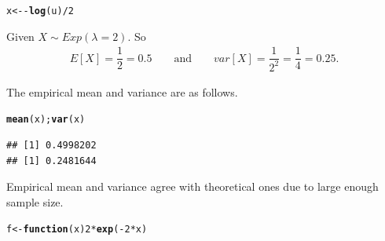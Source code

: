 \documentclass[11pt, a4paper]{article}\usepackage[]{graphicx}\usepackage[]{xcolor}
\makeatletter
\newcommand{\hlnum}[1]{\textcolor[rgb]{0.686,0.059,0.569}{#1}}%
\newcommand{\hlopt}[1]{\textcolor[rgb]{0,0,0}{#1}}%
\newcommand{\hldef}[1]{\textcolor[rgb]{0.345,0.345,0.345}{#1}}%
\newcommand{\hlkwa}[1]{\textcolor[rgb]{0.161,0.373,0.58}{\textbf{#1}}}%
\newcommand{\hlkwb}[1]{\textcolor[rgb]{0.69,0.353,0.396}{#1}}%
\newcommand{\hlkwc}[1]{\textcolor[rgb]{0.333,0.667,0.333}{#1}}%
\newcommand{\hlkwd}[1]{\textcolor[rgb]{0.737,0.353,0.396}{\textbf{#1}}}%
\newenvironment{kframe}{%
 \def\at@end@of@kframe{}%
 \ifinner\ifhmode%
  \def\at@end@of@kframe{\end{minipage}}%
  \begin{minipage}{\columnwidth}%
 \fi\fi%
 \def\FrameCommand##1{\hskip\@totalleftmargin \hskip-\fboxsep
 \colorbox{shadecolor}{##1}\hskip-\fboxsep
     \hskip-\linewidth \hskip-\@totalleftmargin \hskip\columnwidth}%
 \MakeFramed {\advance\hsize-\width
   \@totalleftmargin\z@ \linewidth\hsize
   \@setminipage}}%
 {\par\unskip\endMakeFramed%
 \at@end@of@kframe}
\newenvironment{knitrout}{}{} %
\makeatother
\begin{document}
\begin{knitrout}
\color{fgcolor}\begin{kframe}
\begin{alltt}
\hldef{x} \hlkwb{<-} \hlopt{-} \hlkwd{log}\hldef{(u)} \hlopt{/} \hlnum{2}
\end{alltt}
\end{kframe}
\end{knitrout}

Given $X \sim Exp(\lambda = 2)$. So
\begin{align*}
E[X] = \dfrac{1}{2} = 0.5 \qquad \text{and} \qquad var[X] = \dfrac{1}{2^2} = \dfrac{1}{4} = 0.25.
\end{align*}

The empirical mean and variance are as follows.

\begin{knitrout}
\color{fgcolor}\begin{kframe}
\begin{alltt}
\hlkwd{mean}\hldef{(x);} \hlkwd{var}\hldef{(x)}
\end{alltt}
\begin{verbatim}
## [1] 0.4998202
## [1] 0.2481644
\end{verbatim}
\end{kframe}
\end{knitrout}

\smallpencil \hspace{0.1cm} {\setlength{\spaceskip}{1em plus 0.5em minus 0.5em} \fontsize{17}{20}\myfont Empirical mean and variance agree with theoretical ones due to large enough sample size. \par}

\newpage



\begin{knitrout}
\color{fgcolor}\begin{kframe}
\begin{alltt}
\hldef{f} \hlkwb{<-} \hlkwa{function}\hldef{(}\hlkwc{x}\hldef{)} \hlnum{2} \hlopt{*} \hlkwd{exp}\hldef{(}\hlopt{-}\hlnum{2} \hlopt{*} \hldef{x)}
\end{alltt}
\end{kframe}
\end{knitrout}
\end{document}
